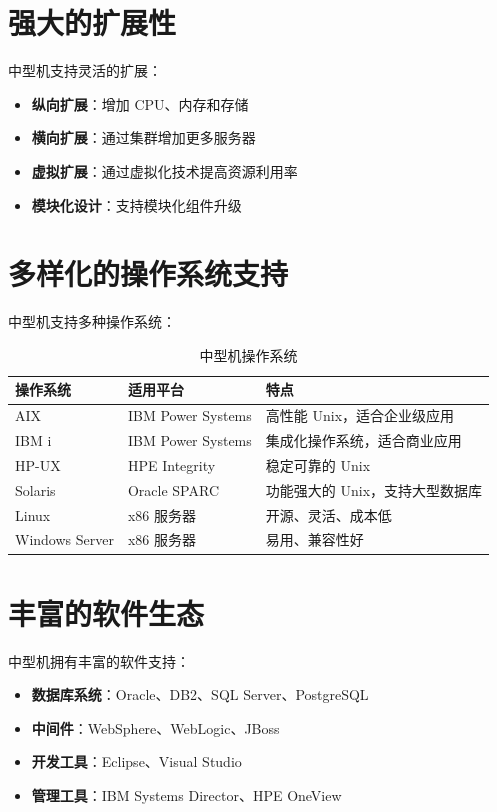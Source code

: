 \documentclass[12pt,UTF8]{ctexbook}
\begin{document}
\section{强大的扩展性}

中型机支持灵活的扩展：

\begin{itemize}[leftmargin=2cm]
    \item \textbf{纵向扩展}：增加 CPU、内存和存储
    \item \textbf{横向扩展}：通过集群增加更多服务器
    \item \textbf{虚拟扩展}：通过虚拟化技术提高资源利用率
    \item \textbf{模块化设计}：支持模块化组件升级
\end{itemize}

\section{多样化的操作系统支持}

中型机支持多种操作系统：

\begin{table}[htbp]
    \centering
    \caption{中型机操作系统}
    \begin{tabular}{|p{3cm}|p{3cm}|p{4cm}|}
        \hline
        \textbf{操作系统} & \textbf{适用平台} & \textbf{特点} \\
        \hline
        AIX & IBM Power Systems & 高性能 Unix，适合企业级应用 \\
        \hline
        IBM i & IBM Power Systems & 集成化操作系统，适合商业应用 \\
        \hline
        HP-UX & HPE Integrity & 稳定可靠的 Unix \\
        \hline
        Solaris & Oracle SPARC & 功能强大的 Unix，支持大型数据库 \\
        \hline
        Linux & x86 服务器 & 开源、灵活、成本低 \\
        \hline
        Windows Server & x86 服务器 & 易用、兼容性好 \\
        \hline
    \end{tabular}
\end{table}

\section{丰富的软件生态}

中型机拥有丰富的软件支持：

\begin{itemize}[leftmargin=2cm]
    \item \textbf{数据库系统}：Oracle、DB2、SQL Server、PostgreSQL
    \item \textbf{中间件}：WebSphere、WebLogic、JBoss
    \item \textbf{开发工具}：Eclipse、Visual Studio
    \item \textbf{管理工具}：IBM Systems Director、HPE OneView
\end{itemize}
\end{document}
